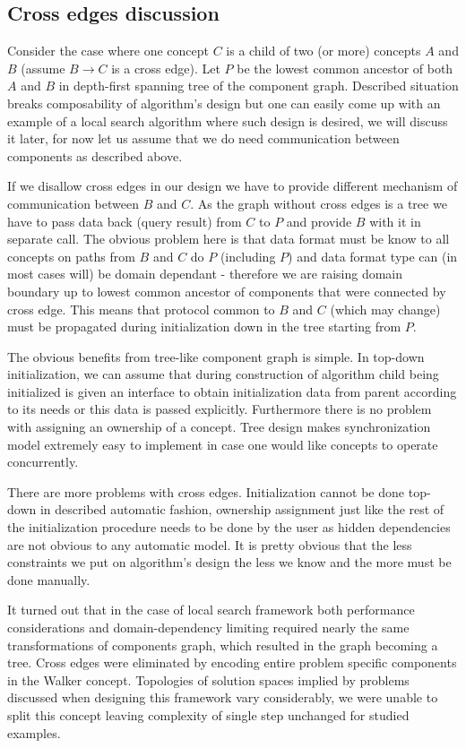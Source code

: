 \subsection{Cross edges discussion}
Consider the case where one concept $C$ is a child of two (or more) concepts
$A$ and $B$ (assume $B \to C$ is a cross edge). Let $P$ be the lowest common
ancestor of both $A$ and $B$ in depth-first spanning tree of the component
graph. Described situation breaks composability of algorithm's design but one
can easily come up with an example of a local search algorithm where such
design is desired, we will discuss it later, for now let us assume that we do
need communication between components as described above.

If we disallow cross edges in our design we have to provide different mechanism
of communication between $B$ and $C$. As the graph without cross edges is a
tree we have to pass data back (query result) from $C$ to $P$ and provide $B$
with it in separate call. The obvious problem here is that data format must be
know to all concepts on paths from $B$ and $C$ do $P$ (including $P$) and data
format type can (in most cases will) be domain dependant - therefore we are
raising domain boundary up to lowest common ancestor of components that were
connected by cross edge. This means that protocol common to $B$ and $C$ (which
may change) must be propagated during initialization down in the tree starting
from $P$.

The obvious benefits from tree-like component graph is simple. In top-down
initialization, we can assume that during construction of algorithm child being
initialized is given an interface to obtain initialization data from parent
according to its needs or this data is passed explicitly. Furthermore there is
no problem with assigning an ownership of a concept. Tree design makes
synchronization model extremely easy to implement in case one would like
concepts to operate concurrently.

There are more problems with cross edges. Initialization cannot be done
top-down in described automatic fashion, ownership assignment just like the
rest of the initialization procedure needs to be done by the user as hidden
dependencies are not obvious to any automatic model. It is pretty obvious that
the less constraints we put on algorithm's design the less we know and the more
must be done manually.

It turned out that in the case of local search framework both performance
considerations and domain-dependency limiting required nearly the same
transformations of components graph, which resulted in the graph becoming a
tree. Cross edges were eliminated by encoding entire problem specific
components in the Walker concept. Topologies of solution spaces implied by
problems discussed when designing this framework vary considerably, we were
unable to split this concept leaving complexity of single step unchanged for
studied examples.

